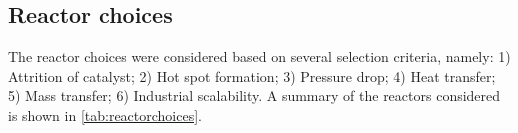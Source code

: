 \subsection{Reactor choices}
The reactor choices were considered based on several selection criteria, namely: 1) Attrition of catalyst; 2) Hot spot formation; 3) Pressure drop; 4) Heat transfer; 5) Mass transfer; 6) Industrial scalability.
A summary of the reactors considered is shown in \cref{tab:reactorchoices}.
